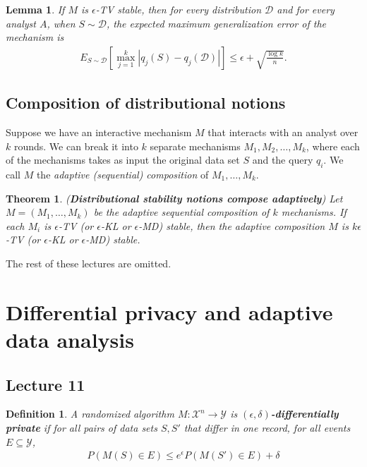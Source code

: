 \documentclass[]{article}
\newtheorem{theorem}{Theorem}[section]
\newtheorem{lemma}{Lemma}[section]
\newtheorem{definition}{Definition}[section] %
\begin{document}
\begin{lemma}
	If $M$ is $\epsilon$-TV stable, then for every distribution $\mathcal{D}$ and for every analyst $A$, when $S \sim \mathcal{D}$, the expected maximum generalization error of the mechanism is 
	\begin{align*}
	E_{S \sim \mathcal{D}}\left[\max_{j=1}^k |q_j(S) - q_j(\mathcal{D})|\right] \le \epsilon+\sqrt{\frac{\log k}{n}}.
	\end{align*}
\end{lemma}

\subsection{Composition of distributional notions}

Suppose we have an interactive mechanism $M$ that interacts with an analyst over $k$ rounds. We can break it into $k$ separate mechanisms $M_1, M_2, \dots, M_k$, where each of the mechanisms takes as input the original data set $S$ and the query $q_i$. We call $M$ the \textit{adaptive (sequential) composition} of $M_1, \dots, M_k$. 

\begin{theorem} (\textbf{Distributional stability notions compose adaptively})
	Let $M=(M_1,\dots,M_k)$ be the adaptive sequential composition of $k$ mechanisms. If each $M_i$ is $\epsilon$-TV (or $\epsilon$-KL or $\epsilon$-MD) stable, then the adaptive composition $M$ is $k\epsilon$-TV (or $\epsilon$-KL or $\epsilon$-MD) stable. 
\end{theorem}

The rest of these lectures are omitted. 


\section{Differential privacy and adaptive data analysis}

\subsection{Lecture 11}
\begin{definition}
	A randomized algorithm $M:\mathcal{X}^n \rightarrow \mathcal{Y}$ is \textbf{$(\epsilon,\delta)$-differentially private} if for all pairs of data sets $S, S'$ that differ in one record, for all events $E \subseteq \mathcal{Y}$, 
	\begin{align*}
		P(M(S) \in E) \le e^\epsilon P(M(S') \in E) + \delta
	\end{align*} 
\end{definition}
\end{document}
